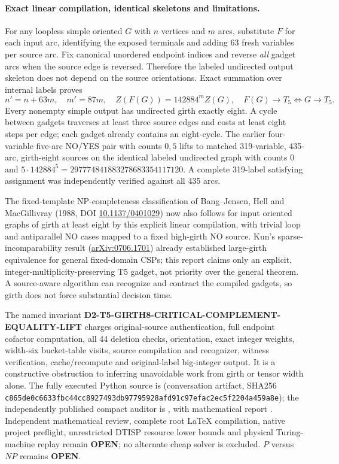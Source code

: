 \documentclass[11pt]{article}
\begin{document}
\paragraph{Exact linear compilation, identical skeletons and limitations.}
For any loopless simple oriented $G$ with $n$ vertices and
$m$ arcs, substitute $F$ for each input arc, identifying
the exposed terminals and adding 63 fresh variables per
source arc. Fix canonical unordered endpoint indices and
reverse \emph{all} gadget arcs when the source edge is
reversed. Therefore the labeled undirected output skeleton
does not depend on the source orientations. Exact summation
over internal labels proves
\[
\boxed{n'=n+63m,\quad m'=87m,\quad
       Z(F(G))=142884^mZ(G),\quad
       F(G)\to T_5\iff G\to T_5.}
\]
Every nonempty simple output has undirected girth exactly
eight. A cycle between gadgets traverses at least three
source edges and costs at least eight steps per edge;
each gadget already contains an eight-cycle.
The earlier four-variable five-arc NO/YES pair with
counts $0,5$ lifts to matched 319-variable, 435-arc,
girth-eight sources on the identical labeled undirected
graph with counts $0$ and
$5\cdot142884^5=297774841883278683354117120$.
A complete 319-label satisfying assignment was
independently verified against all 435 arcs.

The fixed-template NP-completeness classification of
Bang--Jensen, Hell and MacGillivray (1988, DOI
\href{https://doi.org/10.1137/0401029}{10.1137/0401029})
now also follows for input oriented graphs of girth at
least eight by this explicit linear compilation, with
trivial loop and antiparallel NO cases mapped to a fixed
high-girth NO source. Kun's sparse-incomparability result
(\href{https://arxiv.org/abs/0706.1701}{arXiv:0706.1701})
already established large-girth equivalence for general
fixed-domain CSPs; this report claims only an explicit,
integer-multiplicity-preserving T5 gadget, not priority
over the general theorem. A source-aware algorithm can
recognize and contract the compiled gadgets, so girth
does not force substantial decision time.

The named invariant
\textbf{D2-T5-GIRTH8-CRITICAL-COMPLEMENT-EQUALITY-LIFT}
charges original-source authentication, full endpoint
cofactor computation, all 44 deletion checks, orientation,
exact integer weights, width-six bucket-table visits,
source compilation and recognizer, witness verification,
cache/recompute and original-label big-integer output.
It is a constructive obstruction to inferring unavoidable
work from girth or tensor width alone.
The fully executed Python source is
 (conversation artifact,
SHA256 \texttt{c865de0c6633fbc44cc8927493db97795928afd91c97efac2ec5f2204a459a8e});
the independently published compact auditor is
,
with mathematical report
.
Independent mathematical review, complete root LaTeX compilation,
native project preflight, unrestricted DTISP resource lower
bounds and physical Turing-machine replay remain
\textbf{OPEN}; no alternate cheap solver is excluded.
$P$ versus $NP$ remains \textbf{OPEN}.
\end{document}
